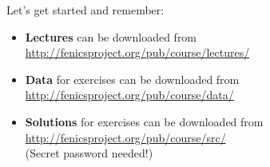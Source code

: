 \documentclass{fenicscourse}
\begin{document}






%




\begin{frame}{Let's get started and remember:}

\linespread{2.0}
\bigskip
\begin{itemize}
\item
{\footnotesize \textbf{Lectures} can be downloaded from
  \url{http://fenicsproject.org/pub/course/lectures/}}

\item
{\footnotesize \textbf{Data} for exercises can be downloaded from
  \url{http://fenicsproject.org/pub/course/data/}}

\item
{\footnotesize \textbf{Solutions} for exercises can be downloaded from
  \url{http://fenicsproject.org/pub/course/src/} \\
(Secret password needed!)
}
\end{itemize}
\linespread{1.0}

\end{frame}
\end{document}
